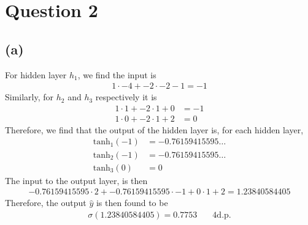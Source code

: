 \documentclass[a4paper]{article}
\theoremstyle{plain}
\theoremstyle{definition}
\theoremstyle{remark}
\begin{document}
\section{Question 2}
\subsection{(a)}
For hidden layer $h_1$, we find the input is
\begin{align*}
	1 \cdot -4 + -2 \cdot -2 - 1 = -1
\end{align*}
Similarly, for $h_2$ and $h_3$ respectively it is
\begin{align*}
	1 \cdot 1 + -2 \cdot 1 + 0 &= -1 \\
	1 \cdot 0 + -2 \cdot 1 + 2 &= 0
\end{align*}
Therefore, we find that the output of the hidden layer is, for each hidden layer,
\begin{align*}
	\text{tanh}_1(-1) &= -0.76159415595\ldots\\
	\text{tanh}_2(-1) &= -0.76159415595\ldots \\
	\text{tanh}_3(0) &= 0
\end{align*}
The input to the output layer, is then
\begin{align*}
	-0.76159415595 \cdot 2 + -0.76159415595 \cdot -1 + 0 \cdot 1 + 2 = 1.23840584405
\end{align*}
Therefore, the output $\hat{y}$ is then found to be
\begin{align*}
	\sigma(1.23840584405) = 0.7753 \text{              }& \text{ 4d.p.}
\end{align*}
\end{document}
